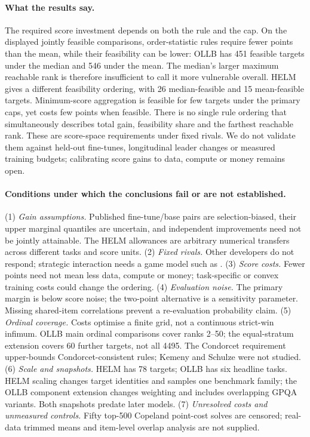\documentclass{article}
\begin{document}
\paragraph{What the results say.}
The required score investment depends on both the rule and the cap. On the displayed jointly feasible comparisons, order-statistic rules require fewer points than the mean, while their feasibility can be lower: OLLB has 451 feasible targets under the median and 546 under the mean. The median's larger maximum reachable rank is therefore insufficient to call it more vulnerable overall. HELM gives a different feasibility ordering, with 26 median-feasible and 15 mean-feasible targets. Minimum-score aggregation is feasible for few targets under the primary caps, yet costs few points when feasible. There is no single rule ordering that simultaneously describes total gain, feasibility share and the farthest reachable rank. These are score-space requirements under fixed rivals. We do not validate them against held-out fine-tunes, longitudinal leader changes or measured training budgets; calibrating score gains to data, compute or money remains open.

\paragraph{Conditions under which the conclusions fail or are not established.}
(1) \emph{Gain assumptions.} Published fine-tune/base pairs are selection-biased, their upper marginal quantiles are uncertain, and independent improvements need not be jointly attainable. The HELM allowances are arbitrary numerical transfers across different tasks and score units. (2) \emph{Fixed rivals.} Other developers do not respond; strategic interaction needs a game model such as \citet{chen2026incentives}. (3) \emph{Score costs.} Fewer points need not mean less data, compute or money; task-specific or convex training costs could change the ordering. (4) \emph{Evaluation noise.} The primary margin is below score noise; the two-point alternative is a sensitivity parameter. Missing shared-item correlations prevent a re-evaluation probability claim. (5) \emph{Ordinal coverage.} Costs optimise a finite grid, not a continuous strict-win infimum. OLLB main ordinal comparisons cover ranks 2--50; the equal-stratum extension covers 60 further targets, not all 4495. The Condorcet requirement upper-bounds Condorcet-consistent rules; Kemeny and Schulze were not studied. (6) \emph{Scale and snapshots.} HELM has 78 targets; OLLB has six headline tasks. HELM scaling changes target identities and samples one benchmark family; the OLLB component extension changes weighting and includes overlapping GPQA variants. Both snapshots predate later models. (7) \emph{Unresolved costs and unmeasured controls.} Fifty top-500 Copeland point-cost solves are censored; real-data trimmed means and item-level overlap analysis are not supplied.
\end{document}
